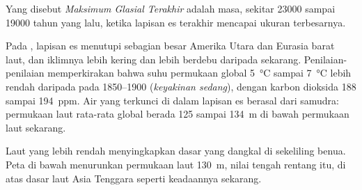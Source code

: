 \begin{definition}\label{def:g12:past-climates:lgm}
Yang disebut \emph{Maksimum Glasial Terakhir}
adalah masa, sekitar \num{23000} sampai \num{19000} tahun yang lalu, ketika
lapisan es  terakhir mencapai ukuran terbesarnya.
\end{definition}

Pada , lapisan es menutupi sebagian besar Amerika Utara
dan Eurasia barat laut, dan iklimnya lebih kering dan lebih berdebu daripada
sekarang. Penilaian-penilaian memperkirakan bahwa suhu permukaan global
\qty{5}{\degreeCelsius} sampai \qty{7}{\degreeCelsius} lebih rendah daripada
pada 1850--1900 (\emph{keyakinan sedang}), dengan karbon dioksida 188 sampai
\qty{194}{ppm}. Air yang terkunci di dalam lapisan es berasal dari samudra:
permukaan laut rata-rata global berada 125 sampai \qty{134}{m} di bawah
permukaan laut sekarang.

Laut yang lebih rendah menyingkapkan dasar yang dangkal di sekeliling benua.
Peta di bawah menurunkan permukaan laut \qty{130}{m}, nilai tengah rentang itu,
di atas dasar laut Asia Tenggara seperti keadaannya sekarang.

